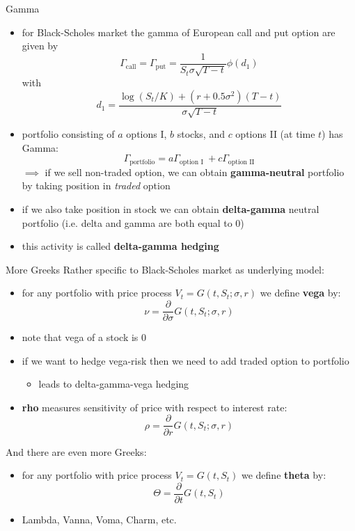 \documentclass[pdf, handout]{beamer}
\begin{document}
\begin{frame}{Gamma}
\begin{itemize}
\item 
for Black-Scholes market the gamma of European call and put option are given by
\[
\Gamma_{\text{call}} = 
\Gamma_{\text{put}} = \frac{1}{S_t\sigma\sqrt{T-t}}\phi(d_1)
 \]
with
\[
d_1= \frac{
\log(S_t/K)+(r +0.5 \sigma^2)(T-t)}{\sigma\sqrt{T-t}}
\]
\item portfolio consisting of $a$ options I, $b$ stocks, and $c$ options II (at time $t$) has Gamma:
\[
\Gamma_{\text{portfolio}} = a \Gamma_{\text{option I }}
+c \Gamma_{\text{option II}}
\]
$\implies$ if we sell non-traded option, we can obtain \textbf{gamma-neutral} portfolio by taking position in
\emph{traded} option
\item if we also take position in stock  
we can obtain \textbf{delta-gamma} neutral portfolio (i.e. delta and gamma are both equal to 0)
\item this activity is called
\textbf{delta-gamma hedging}
\end{itemize}
\end{frame}


\begin{frame}{More Greeks}
Rather specific to Black-Scholes market as underlying model:
\begin{itemize}
\item for any portfolio with price process $V_t=G(t, S_t;\sigma,r)$ we define \textbf{vega} by:
\[
\nu = \frac{\partial}{\partial \sigma} G(t, S_t;\sigma,r)
\]
\item note that vega of a stock is 0
\item if we want to hedge vega-risk then we need to add traded option to portfolio
\begin{itemize}
\item leads to delta-gamma-vega hedging
\end{itemize}
\item \textbf{rho}  measures sensitivity of price
with respect to interest rate:
\[
\rho = \frac{\partial}{\partial r} G(t, S_t;\sigma,r)
\]
\end{itemize}
And there are even more Greeks:
\begin{itemize}
\item  for any portfolio with price process $V_t=G(t, S_t)$ we define \textbf{theta} by:
\[
\Theta = \frac{\partial}{\partial t} G(t, S_t)
\]
\item Lambda, Vanna, Voma, Charm, etc. 
\end{itemize}
\end{frame}
\end{document}
